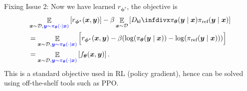 \documentclass[10pt,xcolor={usenames,dvipsnames,table},aspectratio=169]{beamer}
\begin{document}
\begin{frame}{Fixing Issue 2:}
    Now we have learned $r_{\boldsymbol \phi^{\star }}$, the objective is
\begin{align*}
    &\mathop{\mathbb{E}}_{\bm{x} \sim \mathcal{D}, {\blue \bm{y} \sim \pi_{\boldsymbol \theta}(\cdot \mid \bm{x})}} \left[  {r_{\boldsymbol \phi^{\star }}(\bm{x}, \bm{y})} \right] 
    - \beta \mathop{\mathbb{E}}_{\bm{x} \sim \mathcal{D}} \left[  \Dkl{\pi_{\boldsymbol \theta}(\bm{y} \mid \bm{x})}{\pi_{\text{ref}}(\bm{y} \mid \bm{x})}\right] \\
    &= \mathop{\mathbb{E}}_{\bm{x} \sim \mathcal{D}, {\blue \bm{y} \sim \pi_{\boldsymbol \theta}(\cdot \mid \bm{x})}} 
    \Big[  {r_{\boldsymbol \phi^{\star }}(\bm{x}, \bm{y})} - \beta (\log ( \pi_{\boldsymbol \theta}(\bm{y} \mid \bm{x}) ) - \log ( \pi_{\text{ref}}(\bm{y} \mid \bm{x}) )) \Big] \\
    &= \mathop{\mathbb{E}}_{\bm{x} \sim \mathcal{D}, {\blue \bm{y} \sim \pi_{\boldsymbol \theta}(\cdot \mid \bm{x})}} \left[ f_{\boldsymbol \theta}(\bm{x}, \bm{y}) \right].
\end{align*}
This is a standard objective used in RL (policy gradient), hence can be solved using off-the-shelf tools such as PPO.
\end{frame}
\end{document}
